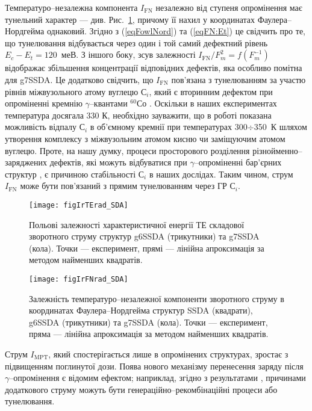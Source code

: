 Температуро--незалежна компонента $I_\mathrm{FN}$ незалежно від ступеня опромінення має тунельний характер --- див. Рис.~\ref{figIrTErad_SDA},
причому її нахил у координатах Фаулера--Нордгейма однаковий.
Згідно з (\ref{eqFowlNord}) та (\ref{eqFN:Et}) це свідчить про те, що тунелювання відбувається через один і той самий дефектний рівень $E_c-E_t=120$~меВ.
З іншого боку,
зсув залежності $I_\mathrm{FN}/F_m^2=f(F_m^{-1})$ відображає збільшення концентрації відповідних дефектів, яка
особливо помітна для g7SSDA.
Це додатково свідчить, що $I_\mathrm{FN}$ пов'язана з тунелюванням за участю рівнів міжвузольного атому вуглецю С$_i$,
який є вторинним дефектом при опроміненні кремнію $\gamma$--квантами $^{60}$Со \cite{Vavilov1990r}.
Оскільки в наших експериментах температура досягала 330 К, необхідно зауважити, що в роботі \cite{Song1987} показана можливість відпалу С$_i$
 в об’ємному кремнії при температурах 300$\div$350~К шляхом утворення комплексу з міжвузольним атомом кисню чи заміщуючим атомом вуглецю.
Проте, на нашу думку, процеси просторового розділення різнойменно--заряджених дефектів, які можуть відбуватися при $\gamma$--опроміненні бар’єрних структур \cite{Muzafarova}, є причиною стабільності С$_i$ в наших дослідах.
Таким чином, струм $I_\mathrm{FN}$ може бути пов'язаний з прямим  тунелюванням через ГР С$_i$.

\begin{figure}
\center
\texttt{[image: figIrTErad\_SDA]}
\caption{\label{figIrTErad_SDA}
Польові залежності характеристичної енергії ТЕ складової зворотного струму структур g6SSDA (трикутники) та g7SSDA (кола).
Точки --- експеримент, прямі --- лінійна апроксимація за методом найменших квадратів.
}%
\end{figure}


\begin{figure}
\center
\texttt{[image: figIrFNrad\_SDA]}
\caption{\label{figIrFNrad_SDA}
Залежність температуро--незалежної компоненти зворотного струму
в координатах Фаулера--Нордгейма
структур SSDA (квадрати), g6SSDA (трикутники) та g7SSDA (кола).
Точки --- експеримент, пряма --- лінійна апроксимація за методом найменших квадратів.
}%
\end{figure}


Струм $I_\mathrm{MPT}$, який спостерігається лише в опромінених структурах, зростає з підвищенням поглинутої дози.
Поява нового механізму перенесення заряду після $\gamma$--опромінення є відомим ефектом;
наприклад, згідно з результатами \cite{Gullu:2008,Karatas:2005NIMA}, причинами додаткового струму можуть бути генераційно--рекомбінаційні процеси або
тунелювання.


